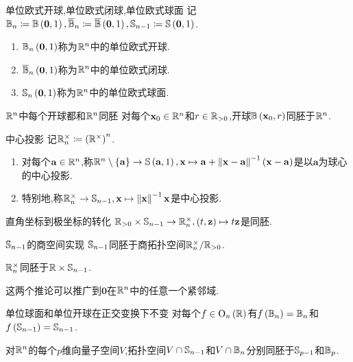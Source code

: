 \begin{definition}{单位欧式开球,单位欧式闭球,单位欧式球面}{}
	记$\B_{n}\coloneq\B\left(\mathbf{0},1\right),\overline{\B}_{n}\coloneq\overline{\B}\left(\mathbf{0},1\right),\S_{n-1}\coloneq\S\left(\mathbf{0},1\right)$.
	\begin{enumerate}
		\item $\B_{n}\left(\mathbf{0},1\right)$称为$\R^{n}$中的单位欧式开球.
		\item $\overline{\B}_{n}\left(\mathbf{0},1\right)$称为$\R^{n}$中的单位欧式闭球.
		\item $\S_{n}\left(\mathbf{0},1\right)$称为$\R^{n}$中的单位欧式球面.
	\end{enumerate}
\end{definition}

\begin{proposition}{$\R^{n}$中每个开球都和$\R^{n}$同胚}{}
	对每个$\mathbf{x}_{0}\in\R^{n}$和$r\in\R_{>0}$,开球$\B\left(\mathbf{x}_{0},r\right)$同胚于$\R^{n}$.
\end{proposition}

\begin{definition}{中心投影}{}
	记$\R_{n}^{\times}\coloneq\left(\R^{\times}\right)^{n}$.
	\begin{enumerate}
		\item 对每个$\mathbf{a}\in\R^{n}$,称$\R^{n}\setminus\left\{\mathbf{a}\right\}\to\S\left(\mathbf{a},1\right),\mathbf{x}\mapsto\mathbf{a}+\left\|\mathbf{x}-\mathbf{a}\right\|^{-1}\left(\mathbf{x}-\mathbf{a}\right)$是以$\mathbf{a}$为球心的中心投影.
		\item 特别地,称$\R_{n}^{\times}\to\S_{n-1},\mathbf{x}\mapsto\left\|\mathbf{x}\right\|^{-1}\mathbf{x}$是中心投影.
	\end{enumerate}
\end{definition}

\begin{proposition}{直角坐标到极坐标的转化}{}
	$\R_{>0}\times\S_{n-1}\to\R_{n}^{\times},\left(t,\mathbf{z}\right)\mapsto t\mathbf{z}$是同胚.
\end{proposition}

\begin{corollary}{$\S_{n-1}$的商空间实现}{}
	$\S_{n-1}$同胚于商拓扑空间$\R_{n}^{\times}/\R_{>0}$.
\end{corollary}

\begin{corollary}{}{}
	$\R_{n}^{\times}$同胚于$\R\times\S_{n-1}$.
\end{corollary}

\begin{remark}{}{}
	这两个推论可以推广到$\mathbf{0}$在$\R^{n}$中的任意一个紧邻域.
\end{remark}

\begin{proposition}{单位球面和单位开球在正交变换下不变}{}
	对每个$f\in\mathrm{O}_{n}\left(\R\right)$有$f\left(\B_{n}\right)=\B_{n}$和$f\left(\S_{n-1}\right)=\S_{n-1}$.
\end{proposition}

\begin{proposition}{}{}
	对$\R^{n}$的每个$p$维向量子空间$V$,拓扑空间$V\cap\S_{n-1}$和$V\cap\B_{n}$分别同胚于$\S_{p-1}$和$\B_{p}$.
\end{proposition}
